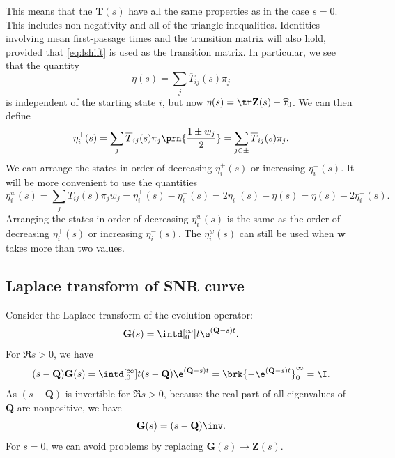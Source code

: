 \documentclass[12pt]{article}
\newcommand{\MMm}{Q}
\newcommand{\MM}{\mathbf{\MMm}}
\newcommand{\eqm}{\pi}
\newcommand{\fptm}{T}
\newcommand{\fpt}{\mathbf{\fptm}}
\newcommand{\fptbm}{\overline{\fptm}}
\newcommand{\fptb}{\overline{\fpt}}
\newcommand{\fundm}{Z}
\newcommand{\fund}{\mathbf{\fundm}}
\newcommand{\etwm}{\eta^w}
\newcommand{\wm}{w}
\newcommand{\w}{\mathbf{\wm}}
\newcommand{\shift}[1]{\widehat{#1}}
\begin{document}
This means that the \( \fptb(s) \) have all the same properties as in the case \(s=0\).
This includes non-negativity and all of the triangle inequalities.
Identities involving mean first-passage times and the transition matrix will also hold, provided that \cref{eq:lshift} is used as the transition matrix.
In particular, we see that the quantity
%
\begin{equation}\label{eq:lkemeny}
  \eta(s) = \sum_j \fptbm_{ij}(s) \eqm_j
\end{equation}
%
is independent of the starting state \(i\), but now \(\eta(s) = \tr\fund(s) - \shift{\tau}_0 \).
We can then define
%
\begin{equation}\label{eq:lpmixtime}
  \eta^{\pm}_i(s) = \sum_j \fptbm_{ij}(s) \eqm_j \prn{\frac{1 \pm \wm_j}{2}} 
      =  \sum_{j\in \pm} \fptbm_{ij}(s) \eqm_j.
\end{equation}
%
We can arrange the states in order of decreasing \(\eta^{+}_i(s)\) or increasing \(\eta^{-}_i(s)\).
It will be more convenient to use the quantities
%
\begin{equation}\label{eq:lwpmixtime}
  \etwm_i(s) = \sum_j \fptbm_{ij}(s)\eqm_j \wm_j
    = \eta^+_i(s) - \eta^-_i(s) 
    = 2\eta^+_i(s) - \eta(s) 
    = \eta(s) - 2\eta^-_i(s) .
\end{equation}
%
Arranging the states in order of decreasing \(\etwm_i(s)\) is the same as the order of decreasing \(\eta^{+}_i(s)\) or increasing \(\eta^{-}_i(s)\).
The \(\etwm_i(s)\) can still be used when \(\w\) takes more than two values.


\subsection{Laplace transform of SNR curve}\label{sec:laplaceSNR}

Consider the Laplace transform of the evolution operator:
%
\begin{equation}\label{eq:levol}
  \mathbf{G}(s) = \intd[_0^{\infty}]{t} \e^{(\MM-s) t}.
\end{equation}
%
For \(\Re s>0\), we have
%
\begin{equation}\label{eq:levolcalc}
  (s-\MM)\mathbf{G}(s) = \intd[_0^{\infty}]{t} (s-\MM)\e^{(\MM-s) t} = \brk{-\e^{(\MM-s) t}}_0^{\infty} = \I.
\end{equation}
%
As \((s-\MM)\) is invertible for \(\Re s>0\), because the real part of all eigenvalues of \(\MM\) are nonpositive, we have
%
\begin{equation}\label{eq:levolres}
  \mathbf{G}(s) = (s-\MM)\inv.
\end{equation}
%
For \(s=0\), we can avoid problems by replacing \(\mathbf{G}(s) \to \fund(s)\).
\end{document}
